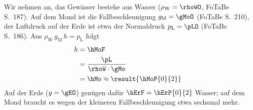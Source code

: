 Wir nehmen an, das Gewässer bestehe aus Wasser ($\rho_\text{W} = \rhoWO$, FoTaBe S.~187). Auf dem Mond ist die Fallbeschleunigung $g_\text{M} = \gMoO$ (FoTaBe S.~210), der Luftdruck auf der Erde ist etwa der Normaldruck $p_\text{L} = \pLO$ (FoTaBe S.~186). Aus $\rho_\text{W}\,g_\text{M}\,h = p_\text{L}$ folgt
\begin{align}
 h &= \hMoF \\
   &= \frac{\pL}{\rhoW\cdot\gMo} \\
   &= \hMo \approx \result{\hMoP{0}{2}}
\end{align}
Auf der Erde ($g = \gEO$) genügen dafür $\hErF = \hErP{0}{2}$ Wasser; auf dem Mond braucht es wegen der kleineren Fallbeschleunigung etwa sechsmal mehr.
